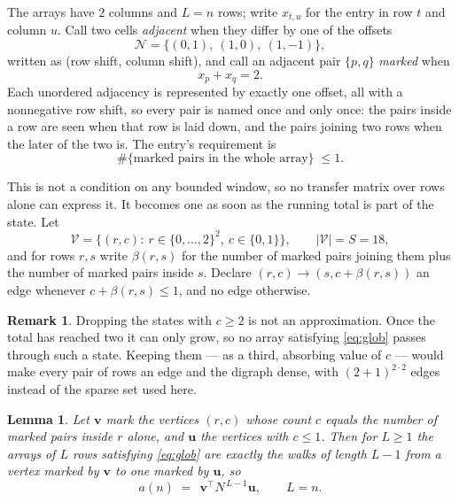\documentclass[11pt,a4paper]{article}
\theoremstyle{plain}
\newtheorem{lemma}[theorem]{Lemma}
\theoremstyle{definition}
\newtheorem{remark}[theorem]{Remark}
\begin{document}
The arrays have $2$ columns and $L=n$ rows; write $x_{t,u}$ for the entry in
row $t$ and column $u$. Call two cells \emph{adjacent} when they differ by one of the
offsets
\[
\mathcal N=\{(0,1),\ (1,0),\ (1,-1)\},
\]
written as (row shift, column shift), and call an adjacent pair $\{p,q\}$
\emph{marked} when
\[
x_{p}+x_{q}=2 .
\]
Each unordered adjacency is represented by exactly one offset, all with a nonnegative row
shift, so every pair is named once and only once: the pairs inside a row are seen when
that row is laid down, and the pairs joining two rows when the later of the two is. The
entry's requirement is
\begin{equation}\label{eq:glob}
\#\{\text{marked pairs in the whole array}\}\;\le1.
\end{equation}

This is not a condition on any bounded window, so no transfer matrix over rows alone can
express it. It becomes one as soon as the running total is part of the state. Let
\[
\mathcal V=\bigl\{(r,c):\ r\in\{0,\dots,2\}^{2},\ c\in\{0,1\}\bigr\},
\qquad |\mathcal V|=S=18,
\]
and for rows $r,s$ write $\beta(r,s)$ for the number of marked pairs joining them plus the
number of marked pairs inside $s$. Declare $(r,c)\to(s,c+\beta(r,s))$ an edge whenever
$c+\beta(r,s)\le1$, and no edge otherwise.

\begin{remark}
Dropping the states with $c\ge2$ is not an approximation. Once the total has reached two it
can only grow, so no array satisfying \eqref{eq:glob} passes through such a state. Keeping
them --- as a third, absorbing value of $c$ --- would make every pair of rows an edge and
the digraph dense, with $(2+1)^{2\cdot2}$ edges instead of the sparse set used here.
\end{remark}

\begin{lemma}\label{lem:walk}
Let $\mathbf{v}$ mark the vertices $(r,c)$ whose count $c$ equals the number of marked pairs
inside $r$ alone, and $\mathbf{u}$ the vertices with $c\le1$. Then for $L\ge1$ the arrays
of $L$ rows satisfying \eqref{eq:glob} are exactly the walks of length $L-1$ from a
vertex marked by $\mathbf{v}$ to one marked by $\mathbf{u}$, so
\[
a(n)\;=\;\,\mathbf{v}^{\!\top}N^{\,L-1}\mathbf{u},\qquad L=n .
\]
\end{lemma}
\end{document}
